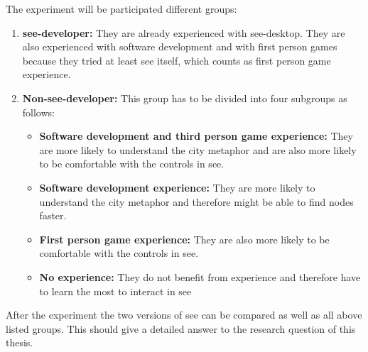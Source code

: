 The experiment will be participated different groups:
\begin{enumerate}
  \item \textbf{\gls{see}-developer:} They are already experienced with \gls{see}-desktop.
        They are also experienced with software development and with first person games because they tried at least \gls{see} itself, which counts as first person game experience.
  \item \textbf{Non-\gls{see}-developer:} This group has to be divided into four subgroups as follows:
        \begin{itemize}
          \item \textbf{Software development and third person game experience:} They are more likely to understand the \gls{city} metaphor and are also more likely to be comfortable with the controls in \gls{see}.
          \item \textbf{Software development experience:} They are more likely to understand the \gls{city} metaphor and therefore might be able to find \glspl{node} faster.
          \item \textbf{First person game experience:} They are also more likely to be comfortable with the controls in \gls{see}.
          \item \textbf{No experience:} They do not benefit from experience and therefore have to learn the most to interact in \gls{see}
        \end{itemize}
\end{enumerate}

After the experiment the two versions of \gls{see} can be compared as well as all above listed groups. 
This should give a detailed answer to the research question of this thesis.
